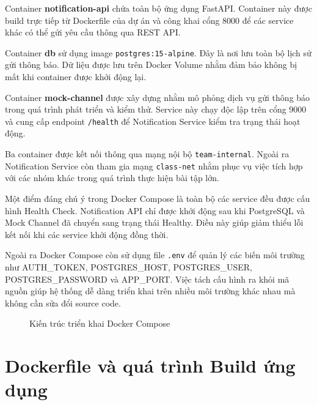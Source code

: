 Container \textbf{notification-api} chứa toàn bộ ứng dụng FastAPI. Container này được build trực tiếp từ Dockerfile của dự án và công khai cổng 8000 để các service khác có thể gửi yêu cầu thông qua REST API.

Container \textbf{db} sử dụng image \texttt{postgres:15-alpine}. Đây là nơi lưu toàn bộ lịch sử gửi thông báo. Dữ liệu được lưu trên Docker Volume nhằm đảm bảo không bị mất khi container được khởi động lại.

Container \textbf{mock-channel} được xây dựng nhằm mô phỏng dịch vụ gửi thông báo trong quá trình phát triển và kiểm thử. Service này chạy độc lập trên cổng 9000 và cung cấp endpoint \texttt{/health} để Notification Service kiểm tra trạng thái hoạt động.

Ba container được kết nối thông qua mạng nội bộ \texttt{team-internal}. Ngoài ra Notification Service còn tham gia mạng \texttt{class-net} nhằm phục vụ việc tích hợp với các nhóm khác trong quá trình thực hiện bài tập lớn.

Một điểm đáng chú ý trong Docker Compose là toàn bộ các service đều được cấu hình Health Check. Notification API chỉ được khởi động sau khi PostgreSQL và Mock Channel đã chuyển sang trạng thái Healthy. Điều này giúp giảm thiểu lỗi kết nối khi các service khởi động đồng thời.

Ngoài ra Docker Compose còn sử dụng file \texttt{.env} để quản lý các biến môi trường như AUTH\_TOKEN, POSTGRES\_HOST, POSTGRES\_USER, POSTGRES\_PASSWORD và APP\_PORT. Việc tách cấu hình ra khỏi mã nguồn giúp hệ thống dễ dàng triển khai trên nhiều môi trường khác nhau mà không cần sửa đổi source code.

\begin{figure}[H]
\centering
{}
\caption{Kiến trúc triển khai Docker Compose}
\label{fig:docker-compose}
\end{figure}


\section{Dockerfile và quá trình Build ứng dụng}

